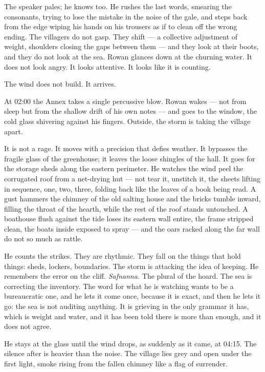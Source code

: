 \documentclass[11pt,oneside]{book}
\newcommand{\sceneline}{%
  \par\vspace{1.2em}
  \begin{center}
    \fontsize{11}{11}\selectfont \textbullet\quad\textbullet\quad\textbullet
  \end{center}
  \vspace{0.6em}\noindent\ignorespaces
}
\begin{document}
The speaker pales; he knows too. He rushes the last words, smearing the
consonants, trying to lose the mistake in the noise of the gale, and
steps back from the edge wiping his hands on his trousers as if to clean
off the wrong ending. The villagers do not gasp. They shift --- a
collective adjustment of weight, shoulders closing the gaps between them
--- and they look at their boots, and they do not look at the sea. Rowan
glances down at the churning water. It does not look angry. It looks
attentive. It looks like it is counting.

\sceneline

The wind does not build. It arrives.

At 02:00 the Annex takes a single percussive blow. Rowan wakes --- not
from sleep but from the shallow drift of his own notes --- and goes to
the window, the cold glass shivering against his fingers. Outside, the
storm is taking the village apart.

It is not a rage. It moves with a precision that defies weather. It
bypasses the fragile glass of the greenhouse; it leaves the loose
shingles of the hall. It goes for the storage sheds along the eastern
perimeter. He watches the wind peel the corrugated roof from a
net-drying hut --- not tear it, unstitch it, the sheets lifting in
sequence, one, two, three, folding back like the leaves of a book being
read. A gust hammers the chimney of the old salting house and the bricks
tumble inward, filling the throat of the hearth, while the rest of the
roof stands untouched. A boathouse flush against the tide loses its
eastern wall entire, the frame stripped clean, the boats inside exposed
to spray --- and the oars racked along the far wall do not so much as
rattle.

He counts the strikes. They are rhythmic. They fall on the things that
hold things: sheds, lockers, boundaries. The storm is attacking the idea
of keeping. He remembers the error on the cliff. \emph{Safnanna.} The
plural of the hoard. The sea is correcting the inventory. The word for
what he is watching wants to be a bureaucratic one, and he lets it come
once, because it is exact, and then he lets it go: the sea is not
auditing anything. It is grieving in the only grammar it has, which is
weight and water, and it has been told there is more than enough, and it
does not agree.

He stays at the glass until the wind drops, as suddenly as it came, at
04:15. The silence after is heavier than the noise. The village lies
grey and open under the first light, smoke rising from the fallen
chimney like a flag of surrender.
\end{document}
